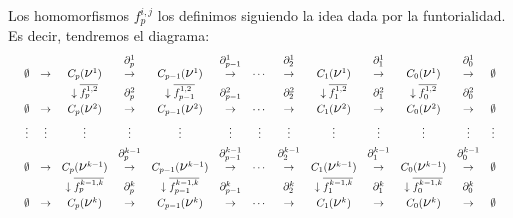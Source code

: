 \documentclass[12pt, a4paper, twoside]{book}
\numberwithin{equation}{section}
\theoremstyle{definition}
\theoremstyle{remark}
\theoremstyle{plain}
\begin{document}
	Los homomorfismos $f_{p}^{i,j}$ los definimos siguiendo la idea dada
	por la funtorialidad. Es decir, tendremos el diagrama:
	\begin{equation*}
		\resizebox{\textwidth}{!}{$ 
		\begin{array}{ccccccccccccc}
			 & & & \partial_{p}^{1} &  & 
			\partial_{p-1}^{1} &  & \partial_{2}^{1}&  & 
			\partial_{1}^{1}&  & 
			\partial_{0}^{1} & \\ 
			\emptyset & \rightarrow & C_{p}(
			\text{{\Large $\nu$}$^{1}$}) & \rightarrow & C_{p-1}(
			\text{{\Large $\nu$}$^{1}$}) & \rightarrow &\cdots & 
			\rightarrow & C_{1}(
			\text{{\Large $\nu$}$^{1}$})& \rightarrow & C_{0}(
			\text{{\Large $\nu$}$^{1}$})& \rightarrow & 
			\emptyset\\[3pt]

			& & \downarrow \overline{f_{p}^{1,2}}& \partial_{p}^{2} & 
			\downarrow \overline{f_{p-1}^{1,2}}& \partial_{p-1}^{2} 
			& & \partial_{2}^{2} & \downarrow \overline{f_{1}^{1,2}}
			& \partial_{1}^{2} & \downarrow \overline{f_{0}^{1,2}} & 
			\partial_{0}^{2} & \\ [3pt]	
			\emptyset & \rightarrow & C_{p}(
			\text{{\Large $\nu$}$^{2}$}) & \rightarrow & C_{p-1}(
			\text{{\Large $\nu$}$^{2}$}) & \rightarrow &\cdots & 
			\rightarrow & C_{1}(
			\text{{\Large $\nu$}$^{2}$})& \rightarrow & C_{0}(
			\text{{\Large $\nu$}$^{2}$})& \rightarrow & 
			\emptyset \\[5pt]
			
			\vdots & \vdots & \vdots & \vdots & \vdots & \vdots & 
			\vdots & \vdots & \vdots & \vdots & \vdots & \vdots & 
			\vdots \\[5pt]
			
			& & & \partial_{p}^{k-1} &  & 
			\partial_{p-1}^{k-1} &  & \partial_{2}^{k-1}&  & 
			\partial_{1}^{k-1}&  & 
			\partial_{0}^{k-1} & \\ 
			\emptyset & \rightarrow & C_{p}(
			\text{{\Large $\nu$}$^{k-1}$}) & \rightarrow & C_{p-1}(
			\text{{\Large $\nu$}$^{k-1}$}) & \rightarrow &\cdots & 
			\rightarrow & C_{1}(
			\text{{\Large $\nu$}$^{k-1}$})& \rightarrow & C_{0}(
			\text{{\Large $\nu$}$^{k-1}$})& \rightarrow & 
			\emptyset\\[3pt]

			& & \downarrow \overline{f_{p}^{k-1,k}}& \partial_{p}^{k} & 
			\downarrow \overline{f_{p-1}^{k-1,k}}& \partial_{p-1}^{k} 
			& & \partial_{2}^{k} & \downarrow \overline{f_{1}^{k-1,k}}
			& \partial_{1}^{k} & \downarrow \overline{f_{0}^{k-1,k}} & 
			\partial_{0}^{k} & \\ [3pt]	
			\emptyset & \rightarrow & C_{p}(
			\text{{\Large $\nu$}$^{k}$}) & \rightarrow & C_{p-1}(
			\text{{\Large $\nu$}$^{k}$}) & \rightarrow &\cdots & 
			\rightarrow & C_{1}(
			\text{{\Large $\nu$}$^{k}$})& \rightarrow & C_{0}(
			\text{{\Large $\nu$}$^{k}$})& \rightarrow & \emptyset \\
		\end{array}$}
	\end{equation*}
\end{document}
